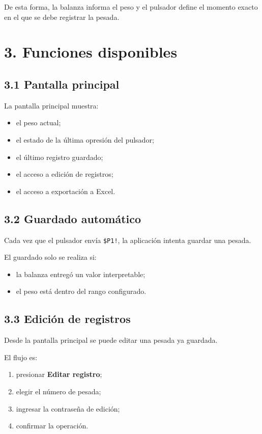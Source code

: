 \documentclass[12pt,a4paper]{article}
\begin{document}
De esta forma, la balanza informa el peso y el pulsador define el momento exacto en el que se debe registrar la pesada.

\section*{3. Funciones disponibles}

\subsection*{3.1 Pantalla principal}

La pantalla principal muestra:

\begin{itemize}
\item el peso actual;
\item el estado de la \'ultima opresi\'on del pulsador;
\item el \'ultimo registro guardado;
\item el acceso a edici\'on de registros;
\item el acceso a exportaci\'on a Excel.
\end{itemize}

\subsection*{3.2 Guardado autom\'atico}

Cada vez que el pulsador env\'ia \texttt{\$P1!}, la aplicaci\'on intenta guardar una pesada.

El guardado solo se realiza si:

\begin{itemize}
\item la balanza entreg\'o un valor interpretable;
\item el peso est\'a dentro del rango configurado.
\end{itemize}

\subsection*{3.3 Edici\'on de registros}

Desde la pantalla principal se puede editar una pesada ya guardada.

El flujo es:

\begin{enumerate}
\item presionar \textbf{Editar registro};
\item elegir el n\'umero de pesada;
\item ingresar la contrase\~na de edici\'on;
\item confirmar la operaci\'on.
\end{enumerate}
\end{document}
